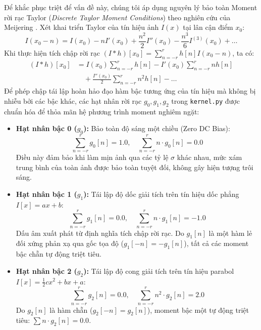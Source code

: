 Để khắc phục triệt để vấn đề này, chúng tôi áp dụng nguyên lý bảo toàn Moment rời rạc Taylor (\textit{Discrete Taylor Moment Conditions}) theo nghiên cứu của Meijering \cite{meijering2004design}. Xét khai triển Taylor của tín hiệu ảnh $I(x)$ tại lân cận điểm $x_0$:
\begin{equation}
I(x_0 - n) = I(x_0) - n I'(x_0) + \frac{n^2}{2} I''(x_0) - \frac{n^3}{6} I^{(3)}(x_0) + \dots
\end{equation}
Khi thực hiện tích chập rời rạc $(I * h)[x_0] = \sum_{n=-r}^r h[n] I(x_0 - n)$, ta có:
\begin{align}
(I * h)[x_0] &= I(x_0) \sum_{n=-r}^r h[n] - I'(x_0) \sum_{n=-r}^r n h[n] \nonumber \\
&\quad + \frac{I''(x_0)}{2} \sum_{n=-r}^r n^2 h[n] - \dots
\end{align}
Để phép chập tái lập hoàn hảo đạo hàm bậc tương ứng của tín hiệu mà không bị nhiễu bởi các bậc khác, các hạt nhân rời rạc $g_0, g_1, g_2$ trong \texttt{kernel.py} được chuẩn hóa để thỏa mãn hệ phương trình moment nghiêm ngặt:
\begin{itemize}
    \item \textbf{Hạt nhân bậc 0 ($g_0$):} Bảo toàn độ sáng một chiều (Zero DC Bias):
    \begin{equation}
    \sum_{n=-r}^r g_0[n] = 1.0, \quad \sum_{n=-r}^r n \cdot g_0[n] = 0.0
    \end{equation}
    Điều này đảm bảo khi làm mịn ảnh qua các tỷ lệ $\sigma$ khác nhau, mức xám trung bình của toàn ảnh được bảo toàn tuyệt đối, không gây hiện tượng trôi sáng.
    \item \textbf{Hạt nhân bậc 1 ($g_1$):} Tái lập độ dốc giải tích trên tín hiệu dốc phẳng $I[x] = ax + b$:
    \begin{equation}
    \sum_{n=-r}^r g_1[n] = 0.0, \quad \sum_{n=-r}^r n \cdot g_1[n] = -1.0
    \end{equation}
    Dấu âm xuất phát từ định nghĩa tích chập rời rạc. Do $g_1[n]$ là một hàm lẻ đối xứng phản xạ qua gốc tọa độ ($g_1[-n] = -g_1[n]$), tất cả các moment bậc chẵn tự động triệt tiêu.
    \item \textbf{Hạt nhân bậc 2 ($g_2$):} Tái lập độ cong giải tích trên tín hiệu parabol $I[x] = \frac{1}{2} c x^2 + bx + a$:
    \begin{equation}
    \sum_{n=-r}^r g_2[n] = 0.0, \quad \sum_{n=-r}^r n^2 \cdot g_2[n] = 2.0
    \end{equation}
    Do $g_2[n]$ là hàm chẵn ($g_2[-n] = g_2[n]$), moment bậc một tự động triệt tiêu: $\sum n \cdot g_2[n] = 0.0$.
\end{itemize}

